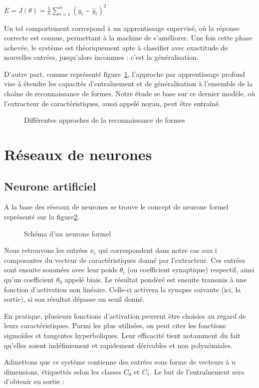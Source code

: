 \documentclass[12pt]{report}
\begin{document}
\begin{center} $ E = J({\theta}) =  \frac{1}{n}\sum\limits_{i=1}^{n} (y_{i} - \hat{y}_{i})^2 $ \end{center}

Un tel comportement correspond à un apprentissage supervisé, où la réponse correcte est connue, permettant à la machine de s'améliorer. Une fois cette phase achevée, le système est théoriquement apte à
classifier avec exactitude de nouvelles entrées, jusqu'alors inconnues : c'est la généralisation.
\par
D'autre part, comme représenté figure~\ref{fig:c1p1s2}, l'approche par apprentissage profond vise à étendre les capacités d'entraînement et de généralisation à l'ensemble de la chaîne de reconnaissance de formes.
Notre étude se base sur ce dernier modèle, où l'extracteur de caractéristiques, aussi appelé noyau, peut être entraîné.

\begin{figure}[H]
    \centering
    \makebox[\textwidth]{}
    \caption{Différentes approches de la reconnaissance de formes}
    \label{fig:c1p1s2}
\end{figure}

\section{Réseaux de neurones}

\subsection{Neurone artificiel}

A la base des réseaux de neurones se trouve le concept de neurone formel représenté sur la figure\ref{fig:c1p2s1}.
\par
\begin{figure}[H]
    \centering
    \makebox[\textwidth]{}
    \caption{Schéma d'un neurone formel}
    \label{fig:c1p2s1}
\end{figure}

Nous retrouvons les entrées $x_{i}$ qui correspondent dans notre cas aux i composantes du vecteur de caractéristiques donné par l'extracteur.
Ces entrées sont ensuite sommées avec leur poids $\theta_{i}$ (ou coefficient synaptique) respectif, ainsi qu'un coefficient $\theta_{0}$ appelé biais.
Le résultat pondéré est ensuite transmis à une fonction d'activation non linéaire\cite{Bib_WikiAN}. Celle-ci activera la synapse suivante (ici, la sortie), si son résultat dépasse un seuil donné.
\par
En pratique, plusieurs fonctions d'activation peuvent être choisies au regard de leurs caractéristiques.
Parmi les plus utilisées, on peut citer les fonctions sigmoïdes et tangentes hyperboliques. Leur efficacité tient notamment du fait qu'elles soient indéfiniement et rapidement dérivables et non polynômiales.
\par
Admettons que ce système contienne des entrées sous forme de vecteurs à $n$ dimensions, étiquettés selon les classes $C_{0}$ et $C_{1}$. Le but de l'entraînement sera d'obtenir en sortie : \\
\end{document}
